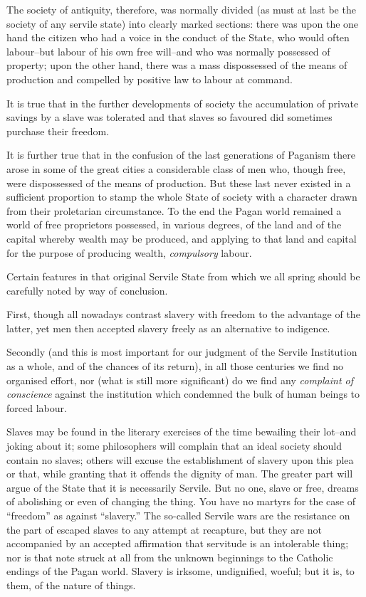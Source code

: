 \documentclass{book}
\begin{document}
The society of antiquity, therefore, was normally divided (as must at last be the society of any servile state) into clearly marked sections: there was upon the one hand the citizen who had a voice in the conduct of the State, who would often labour–but labour of his own free will–and who was normally possessed of property; upon the other hand, there was a mass dispossessed of the means of production and compelled by positive law to labour at command.

It is true that in the further developments of society the accumulation of private savings by a slave was tolerated and that slaves so favoured did sometimes purchase their freedom.

It is further true that in the confusion of the last generations of Paganism there arose in some of the great cities a considerable class of men who, though free, were dispossessed of the means of production. But these last never existed in a sufficient proportion to stamp the whole State of society with a character drawn from their proletarian circumstance. To the end the Pagan world remained a world of free proprietors possessed, in various degrees, of the land and of the capital whereby wealth may be produced, and applying to that land and capital for the purpose of producing wealth, \emph{compulsory} labour.

Certain features in that original Servile State from which we all spring should be carefully noted by way of conclusion.

First, though all nowadays contrast slavery with freedom to the advantage of the latter, yet men then accepted slavery freely as an alternative to indigence.

Secondly (and this is most important for our judgment of the Servile Institution as a whole, and of the chances of its return), in all those centuries we find no organised effort, nor (what is still more significant) do we find any \emph{complaint of conscience} against the institution which condemned the bulk of human beings to forced labour.

Slaves may be found in the literary exercises of the time bewailing their lot–and joking about it; some philosophers will complain that an ideal society should contain no slaves; others will excuse the establishment of slavery upon this plea or that, while granting that it offends the dignity of man. The greater part will argue of the State that it is necessarily Servile. But no one, slave or free, dreams of abolishing or even of changing the thing. You have no martyrs for the case of “freedom” as against “slavery.” The so-called Servile wars are the resistance on the part of escaped slaves to any attempt at recapture, but they are not accompanied by an accepted affirmation that servitude is an intolerable thing; nor is that note struck at all from the unknown beginnings to the Catholic endings of the Pagan world. Slavery is irksome, undignified, woeful; but it is, to them, of the nature of things.
\end{document}
